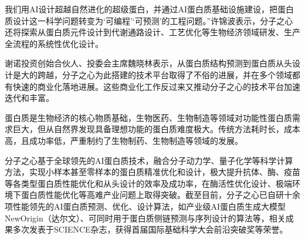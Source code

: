 {}
我们用AI设计超越自然进化的超级蛋白，并通过AI蛋白质基础设施建设，把蛋白质设计这一科学问题转变为‘可编程’‘可预测’的工程问题。”许锦波表示，分子之心还将探索从蛋白质元件设计到代谢通路设计、工艺优化等生物经济领域研发、生产全流程的系统性优化设计。

谢诺投资创始合伙人、投委会主席魏晓林表示，从蛋白质结构预测到蛋白质从头设计是大的跨越，分子之心为此搭建的技术平台取得了不俗的进展，并在多个领域都有快速的商业化落地进展。这些商业化工作反过来又推动分子之心的技术平台加速迭代和丰富。

蛋白质是生物经济的核心物质基础，生物医药、生物制造等领域对功能性蛋白质需求巨大，但从自然界发现具备理想功能的蛋白质难度极大。传统方法耗时长，成本高，且成功率低，严重制约了生物制药、生物制造等领域的发展。

分子之心基于全球领先的AI蛋白质技术，融合分子动力学、量子化学等科学计算方法，实现小样本甚至零样本的蛋白质精准优化和设计，极大提升抗体、酶、疫苗等各类型蛋白质性能优化和从头设计的效率及成功率，在酶活性优化设计、极端环境下蛋白质性能优化等高难产业问题上取得突破。截至目前，分子之心已自研十余项性能领先的AI蛋白质预测、优化、设计算法，如产业级AI蛋白质生成大模型NewOrigin（达尔文）、可同时用于蛋白质侧链预测与序列设计的算法等，相关成果多次发表于SCIENCE杂志，获得首届国际基础科学大会前沿突破奖等荣誉。
